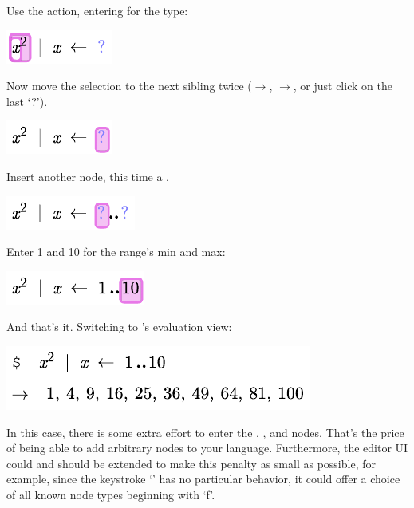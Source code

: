 Use the  action, entering  for the type:
\begin{center}
\includegraphics{src/image/for4.pdf}
\end{center}

Now move the selection to the next sibling twice ($\rightarrow$, $\rightarrow$, or just click on the last `?'). 
\begin{center}
\includegraphics{src/image/for5.pdf}
\end{center}

Insert another node, this time a .
\begin{center}
\includegraphics{src/image/for6.pdf}
\end{center}

Enter 1 and 10 for the range's min and max:
\begin{center}
\includegraphics{src/image/for7.pdf}
\end{center}

And that's it. Switching to \Meta's evaluation view:
\begin{center}
\includegraphics{src/image/for.pdf}
\end{center}

In this case, there is some extra effort to enter the , , and  nodes. That's the price of being able to add arbitrary nodes to your language. Furthermore, the editor UI could and should be extended to make this penalty as small as possible, for example, since the keystroke `' has no particular behavior, it could offer a choice of all known node types beginning with `f'.

